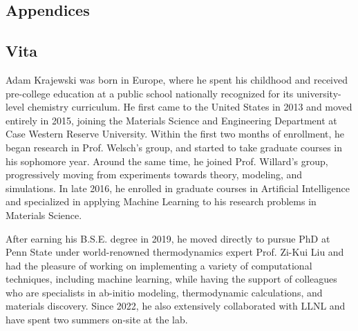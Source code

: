\documentclass[letterpaper, 12pt]{report}
\newcommand{\mypart}[1]{\thispagestyle{empty}\part*{#1}\addtocounter{page}{-1}}
\begin{document}
\begin{appendices}

\mypart{Appendices}













\end{appendices}


\newpage
\chapter*{Vita}
\thispagestyle{empty}

Adam Krajewski was born in Europe, where he spent his childhood and received pre-college education at a public school nationally recognized for its university-level chemistry curriculum. He first came to the United States in 2013 and moved entirely in 2015, joining the Materials Science and Engineering Department at Case Western Reserve University. Within the first two months of enrollment, he began research in Prof. Welsch's group, and started to take graduate courses in his sophomore year. Around the same time, he joined Prof. Willard's group, progressively moving from experiments towards theory, modeling, and simulations. In late 2016, he enrolled in graduate courses in Artificial Intelligence and specialized in applying Machine Learning to his research problems in Materials Science. 

After earning his B.S.E. degree in 2019, he moved directly to pursue PhD at Penn State under world-renowned thermodynamics expert Prof. Zi-Kui Liu and had the pleasure of working on implementing a variety of computational techniques, including machine learning, while having the support of colleagues who are specialists in ab-initio modeling, thermodynamic calculations, and materials discovery. Since 2022, he also extensively collaborated with LLNL and have spent two summers on-site at the lab.
\end{document}
